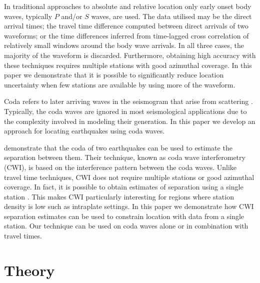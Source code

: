 \documentclass[extra]{gji}
\begin{document}
In traditional approaches to absolute and relative location
only early onset body waves, typically $P$ and/or $S$ waves, are used.
The data utilised may be the direct arrival times; the travel time difference computed
between direct arrivals of two waveforms; or the time differences
inferred from time-lagged cross correlation of relatively small windows
around the body wave arrivals.
 In all three cases, the majority of the
waveform is discarded. Furthermore, obtaining high accuracy with these techniques
requires multiple stations with good azimuthal coverage.
In this paper we demonstrate that it is possible to
significantly reduce location uncertainty when few stations are
available by using more of the waveform.

Coda refers to  later arriving waves in the seismogram that arise from
scattering  \citep{dr_Aki69a,dr_Snieder99a,dr_Snieder06a}.
Typically, the coda waves are ignored in most seismological
applications due to the complexity involved in modeling their
generation. In this
paper we develop an approach for locating earthquakes using coda waves.

\citet{dr_Snieder05a} demonstrate that the coda of two earthquakes
can be used to estimate the separation between them. Their
technique, known as coda wave interferometry (CWI), is based on the
interference pattern between the coda waves. Unlike travel time
techniques, CWI
 does not require multiple stations or good azimuthal coverage.
In fact, it is possible to obtain estimates of separation using a single
station \citep{dr_Robinson07b}. This makes CWI particularly interesting
for regions where station density is low such as intraplate settings. In this
paper we demonstrate how CWI separation estimates can be used to constrain
location with data from a single station.
Our technique can be used on coda waves alone or in combination with
travel times.

\section{Theory}
\label{sec:theory}
\end{document}
